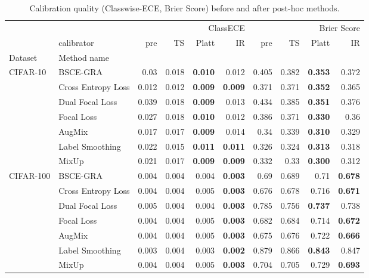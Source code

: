 
\begin{table}[htbp]
\centering
\scriptsize
\setlength{\tabcolsep}{4pt}
\caption{Calibration quality (Classwise-ECE, Brier Score) before and after post-hoc methods.}
\label{tab:calibration_summary}
\begin{tabular}{l l rrrr rrrr}
\toprule
 &  & \multicolumn{4}{r}{ClassECE} & \multicolumn{4}{r}{Brier Score} \\
 & calibrator & pre & TS & Platt & IR & pre & TS & Platt & IR \\
Dataset & Method name &  &  &  &  &  &  &  &  \\
\midrule
\multirow[t]{7}{*}{CIFAR-10} 
 & BSCE-GRA & 0.03 & 0.018 & \textbf{0.010} & 0.012 & 0.405 & 0.382 & \textbf{0.353} & 0.372 \\
 & Cross Entropy Loss & 0.012 & 0.012 & \textbf{0.009} & \textbf{0.009} & 0.371 & 0.371 & \textbf{0.352} & 0.365 \\
 & Dual Focal Loss & 0.039 & 0.018 & \textbf{0.009} & 0.013 & 0.434 & 0.385 & \textbf{0.351} & 0.376 \\
 & Focal Loss & 0.027 & 0.018 & \textbf{0.010} & 0.012 & 0.386 & 0.371 & \textbf{0.330} & 0.36 \\
 & AugMix & 0.017 & 0.017 & \textbf{0.009} & 0.014 & 0.34 & 0.339 & \textbf{0.310} & 0.329 \\
 & Label Smoothing & 0.022 & 0.015 & \textbf{0.011} & \textbf{0.011} & 0.326 & 0.324 & \textbf{0.313} & 0.318 \\
 & MixUp & 0.021 & 0.017 & \textbf{0.009} & \textbf{0.009} & 0.332 & 0.33 & \textbf{0.300} & 0.312 \\
\cline{1-10}
\multirow[t]{7}{*}{CIFAR-100} 
 & BSCE-GRA & 0.004 & 0.004 & 0.004 & \textbf{0.003} & 0.69 & 0.689 & 0.71 & \textbf{0.678} \\
 & Cross Entropy Loss & 0.004 & 0.004 & 0.005 & \textbf{0.003} & 0.676 & 0.678 & 0.716 & \textbf{0.671} \\
 & Dual Focal Loss & 0.005 & 0.004 & 0.004 & \textbf{0.003} & 0.785 & 0.756 & \textbf{0.737} & 0.738 \\
 & Focal Loss & 0.004 & 0.004 & 0.005 & \textbf{0.003} & 0.682 & 0.684 & 0.714 & \textbf{0.672} \\
 & AugMix & 0.004 & 0.004 & 0.005 & \textbf{0.003} & 0.675 & 0.676 & 0.722 & \textbf{0.666} \\
 & Label Smoothing & 0.003 & 0.004 & 0.003 & \textbf{0.002} & 0.879 & 0.866 & \textbf{0.843} & 0.847 \\
 & MixUp & 0.004 & 0.004 & 0.005 & \textbf{0.003} & 0.704 & 0.705 & 0.729 & \textbf{0.693} \\

\end{tabular}
\end{table}
